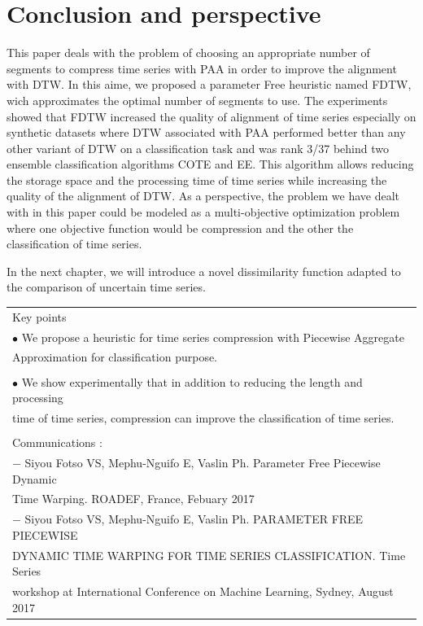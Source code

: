 \section{Conclusion and perspective}
\label{sec:5}
This paper deals with the problem of choosing an appropriate number of segments to compress time series with PAA in order to improve the alignment with DTW. In this aime, we proposed a parameter Free heuristic named FDTW, wich approximates the optimal number of segments to use. The experiments showed that FDTW increased the quality of alignment of time series especially on synthetic datasets where DTW associated with PAA performed better than any other variant of DTW on a classification task and was rank 3/37 behind two ensemble classification algorithms COTE and EE. This algorithm allows reducing the storage space and the processing time of time series while increasing the quality of the alignment of DTW. As a perspective, the problem we have dealt with in this paper could be modeled as a multi-objective optimization problem where one objective function would be compression and the other the classification of time series. 


In the next chapter, we will introduce a novel dissimilarity function adapted to the comparison of uncertain time series.


\begin{table}[ht]
\centering
\begin{tabular}{|l|}

\hline
\rowcolor{LavenderBlush}
Key points\\
$\bullet$ We propose a heuristic for time series compression with Piecewise Aggregate\\ Approximation for classification purpose. \\
\\
$\bullet$ We show experimentally that in addition to reducing the length and processing\\ time of time series, compression can improve the classification of time series.\\ 
\\
Communications :\\
$-$ Siyou Fotso VS, Mephu-Nguifo E, Vaslin Ph. Parameter Free Piecewise Dynamic\\ Time Warping. ROADEF, France, Febuary 2017\\
$-$  Siyou Fotso VS, Mephu-Nguifo E, Vaslin Ph. PARAMETER FREE PIECEWISE\\ DYNAMIC TIME WARPING FOR TIME SERIES CLASSIFICATION. Time Series \\ workshop at International Conference on Machine Learning, Sydney, August 2017\\
\hline
\end{tabular}
\end{table}